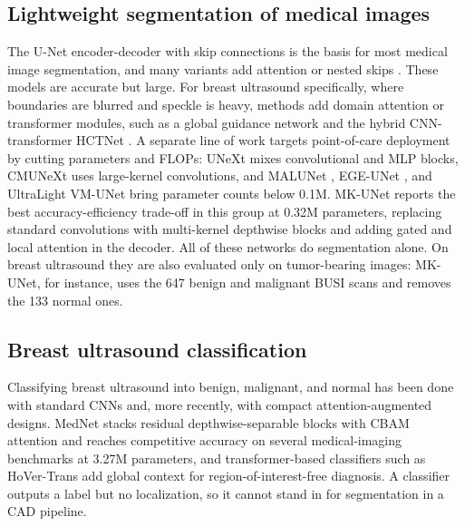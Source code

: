 \documentclass[runningheads]{llncs}
\begin{document}
\subsection{Lightweight segmentation of medical images}
The U-Net encoder-decoder with skip connections \cite{UNet} is the basis for most
medical image segmentation, and many variants add attention or nested skips
\cite{AttnUNet,UNetpp}. These models are accurate but large. For breast
ultrasound specifically, where boundaries are blurred and speckle is heavy,
methods add domain attention or transformer modules, such as a global guidance
network \cite{GGN} and the hybrid CNN-transformer HCTNet \cite{HCTNet}. A separate
line of work targets point-of-care deployment by cutting parameters and FLOPs:
UNeXt \cite{UNeXt} mixes convolutional and MLP blocks, CMUNeXt \cite{CMUNeXt} uses
large-kernel convolutions, and MALUNet \cite{MALUNet}, EGE-UNet \cite{EGEUNet},
and UltraLight VM-UNet \cite{VMUNet} bring parameter counts below 0.1M. MK-UNet
\cite{MKUNet} reports the best accuracy-efficiency trade-off in this group at
0.32M parameters, replacing standard convolutions with multi-kernel depthwise
blocks and adding gated and local attention in the decoder. All of these networks
do segmentation alone. On breast ultrasound they are also evaluated only on
tumor-bearing images: MK-UNet, for instance, uses the 647 benign and malignant
BUSI scans and removes the 133 normal ones.

\subsection{Breast ultrasound classification}
Classifying breast ultrasound into benign, malignant, and normal has been done
with standard CNNs and, more recently, with compact attention-augmented designs.
MedNet \cite{MedNet} stacks residual depthwise-separable blocks with CBAM
attention \cite{CBAM} and reaches competitive accuracy on several medical-imaging
benchmarks at 3.27M parameters, and transformer-based classifiers such as
HoVer-Trans \cite{HoVerTrans} add global context for region-of-interest-free
diagnosis. A classifier outputs a label but no localization, so it cannot stand
in for segmentation in a CAD pipeline.
\end{document}

